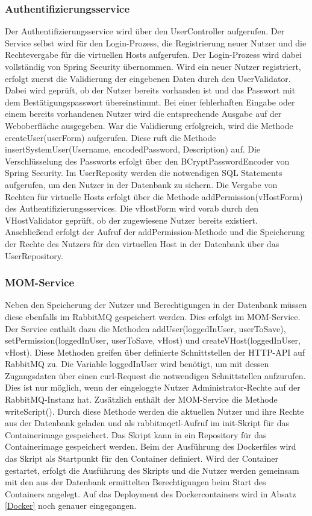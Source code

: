 \subsubsection{Authentifizierungsservice}\label{momservice}
Der Authentifizierungsservice wird über den UserController aufgerufen. Der Service selbst wird für den Login-Prozess, die Registrierung neuer Nutzer und die Rechtevergabe für die virtuellen Hosts aufgerufen. Der Login-Prozess wird dabei vollständig von Spring Security übernommen. Wird ein neuer Nutzer registriert, erfolgt zuerst die Validierung der eingebenen Daten durch den UserValidator. Dabei wird geprüft, ob der Nutzer bereits vorhanden ist und das Passwort mit dem Bestätigungspasswort übereinstimmt. Bei einer fehlerhaften Eingabe oder einem bereits vorhandenen Nutzer wird die entsprechende Ausgabe auf der Weboberfläche ausgegeben. War die Validierung erfolgreich, wird die Methode createUser(userForm) aufgerufen. Diese ruft die Methode insertSystemUser(Username, encodedPassword, Description) auf. Die Verschlüsselung des Passworts erfolgt über den BCryptPasswordEncoder von Spring Security. Im UserReposity werden die notwendigen SQL Statements aufgerufen, um den Nutzer in der Datenbank zu sichern. Die Vergabe von Rechten für virtuelle Hosts erfolgt über die Methode addPermission(vHostForm) des Authentifizierungsservices. Die vHostForm wird vorab durch den VHostValidator geprüft, ob der zugewiesene Nutzer bereits existiert. Anschließend erfolgt der Aufruf der addPermission-Methode und die Speicherung der Rechte des Nutzers für den virtuellen Host in der Datenbank über das UserRepository.
\subsubsection{MOM-Service}
Neben den Speicherung der Nutzer und Berechtigungen in der Datenbank müssen diese ebenfalls im RabbitMQ gespeichert werden. Dies erfolgt im MOM-Service. Der Service enthält dazu die Methoden addUser(loggedInUser, userToSave), setPermission(loggedInUser, userToSave, vHost) und createVHost(loggedInUser, vHost). Diese Methoden greifen über definierte Schnittstellen der HTTP-API auf RabbitMQ zu. Die Variable loggedInUser wird benötigt, um mit dessen Zugangsdaten über einen curl-Request die notwendigen Schnittstellen aufzurufen. Dies ist nur möglich, wenn der eingeloggte Nutzer Administrator-Rechte auf der RabbitMQ-Instanz hat. Zusätzlich enthält der MOM-Service die Methode writeScript(). Durch diese Methode werden die aktuellen Nutzer und ihre Rechte aus der Datenbank geladen und als rabbitmqctl-Aufruf im init-Skript für das Containerimage gespeichert. Das Skript kann in ein Repository für das Containerimage gespeichert werden. Beim der Ausführung des Dockerfiles  wird das Skript als Startpunkt für den Container definiert. Wird der Container gestartet, erfolgt die Ausführung des Skripts und die Nutzer werden gemeinsam mit den aus der Datenbank ermittelten Berechtigungen beim Start des Containers angelegt. Auf das Deployment des Dockercontainers wird in Absatz \ref{Docker} noch genauer eingegangen.




